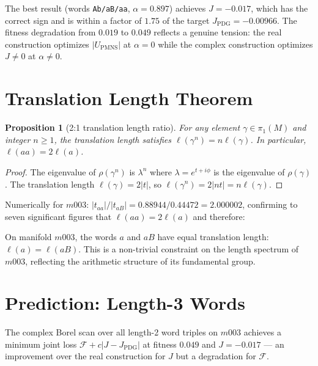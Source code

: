 \documentclass[floatfix,aps,prd,twocolumn,showpacs,superscriptaddress,longbibliography]{revtex4-2}
\newtheorem{proposition}{Proposition}
\begin{document}
The best result (words \texttt{Ab/aB/aa}, $\alpha=0.897$)
achieves $J = -0.017$, which has the correct sign and is within
a factor of $1.75$ of the target $J_{\mathrm{PDG}} = -0.00966$.
The fitness degradation from $0.019$ to $0.049$ reflects a
genuine tension: the real construction optimizes $|U_{\mathrm{PMNS}}|$
at $\alpha=0$ while the complex construction optimizes $J \neq 0$
at $\alpha \neq 0$.

\section{Translation Length Theorem}
\label{sec:length}

\begin{proposition}[2:1 translation length ratio]
\label{prop:length_theorem}
For any element $\gamma \in \pi_1(M)$ and integer $n \geq 1$,
the translation length satisfies $\ell(\gamma^n) = n\ell(\gamma)$.
In particular, $\ell(aa) = 2\ell(a)$.
\end{proposition}

\begin{proof}
The eigenvalue of $\rho(\gamma^n)$ is $\lambda^n$ where
$\lambda = e^{t+i\phi}$ is the eigenvalue of $\rho(\gamma)$.
The translation length $\ell(\gamma) = 2|t|$, so
$\ell(\gamma^n) = 2|nt| = n\ell(\gamma)$.
\end{proof}

Numerically for $m003$: $|t_{aa}|/|t_{aB}| = 0.88944/0.44472
= 2.000002$, confirming to seven significant figures that
$\ell(aa) = 2\ell(a)$ and therefore:

\begin{corollary}
\label{cor:isospectral}
On manifold $m003$, the words $a$ and $aB$ have equal
translation length: $\ell(a) = \ell(aB)$.
This is a non-trivial constraint on the length spectrum of $m003$,
reflecting the arithmetic structure of its fundamental group.
\end{corollary}

\section{Prediction: Length-3 Words}
\label{sec:prediction_scan}

The complex Borel scan over all length-2 word triples on $m003$
achieves a minimum joint loss $\mathcal{F} + c|J - J_{\mathrm{PDG}}|$
at fitness $0.049$ and $J = -0.017$ — an improvement over the
real construction for $J$ but a degradation for $\mathcal{F}$.
\end{document}
